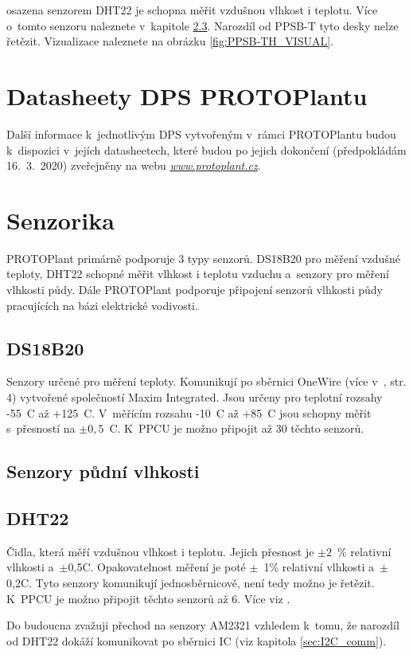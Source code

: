 \noindent{} osazena senzorem DHT22 \cite{DHT22} je schopna měřit vzdušnou vlhkost i teplotu.
Více o~tomto senzoru naleznete v~kapitole \ref{sec:DHT22}.
Narozdíl od PPSB-T tyto desky nelze řetězit.
Vizualizace naleznete na obrázku \ref{fig:PPSB-TH_VISUAL}.\newline

\section{Datasheety DPS PROTOPlantu}
\label{sec:DPS_datasheets}
Další informace k~jednotlivým DPS vytvořeným v~rámci PROTOPlantu budou k~dispozici v~jejích datasheetech, které budou po jejich dokončení (předpokládám 16.~3.~2020) zveřejněny na webu \textit{\url{www.protoplant.cz}}.

\section{Senzorika}
PROTOPlant primárně podporuje 3 typy senzorů. 
DS18B20 pro měření vzdušné teploty, DHT22 schopné měřit vlhkost i teplotu vzduchu a~senzory pro měření vlhkosti půdy.
Dále PROTOPlant podporuje připojení senzorů vlhkosti půdy pracujících na bázi elektrické vodivosti.

\subsection{DS18B20}
\label{sec:DS18B20}
Senzory určené pro měření teploty. 
Komunikují po sběrnici OneWire (více v~\cite{DS18B20}, str. 4) vytvořené společností Maxim Integrated.
Jsou určeny pro teplotní rozsahy -55~\degree C až +125~\degree C.
V~měřícím rozsahu -10~\degree C až +85~\degree C jsou schopny měřit s~přesností na $\pm0,5$~\degree C.
K~PPCU je možno připojit až 30 těchto senzorů.


\subsection{Senzory půdní vlhkosti}

\subsection{DHT22}
\label{sec:DHT22}
Čidla, která měří vzdušnou vlhkost i teplotu.
Jejich přesnost je $\pm2$~$\%$ relativní vlhkosti a~$\pm$0,5\degree C.
Opakovatelnost měření je poté $\pm$~1\% relativní vlhkosti a~$\pm$0,2\degree C.
Tyto senzory komunikují jednosběrnicově, není tedy možno je řetězit.
K~PPCU je možno připojit těchto senzorů až 6.
Více viz \cite{DHT22}.

Do budoucna zvažuji přechod na senzory AM2321 \cite{AM2321} vzhledem k~tomu, že narozdíl od DHT22 dokáží komunikovat po sběrnici IC (viz kapitola \ref{sec:I2C_comm}).

\newpage